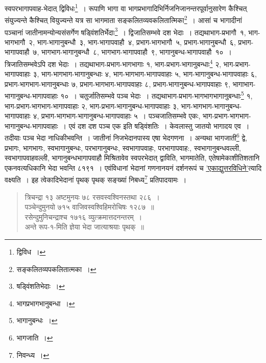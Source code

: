 \documentclass[10pt, openany]{book}
\begin{document}
\newpage

{स्वपरभागापवाह-भेदात् द्विविधः\renewcommand{\thefootnote}{\s ३}\footnote{\s  द्विविध~।}~। रूपाणि भागा वा
भागप्रभागादिभिर्निजनिजानन्तरपूर्वानुसारेण 
कैश्चित् संयुज्यन्ते कैश्चित् वियुज्यन्ते यत्र सा भागमाता
सङ्कलितव्यवकलितात्मिका\renewcommand{\thefootnote}{\s ४}\footnote{\s  सङ्कलितव्यपकलितात्मका~।}~। आसां च भागादीनां पञ्चानां जातीनामन्योन्यसंसर्गेण
षड्विंशतिर्भेदाः\renewcommand{\thefootnote}{\s ५}\footnote{\s षड्विंशतिभेदाः~।}~।}
{द्विजातिसम्भवे दश भेदाः~। तद्यथा\textemdash भाग-प्रभागौ~१, भाग-भागभागौ~२,
भाग-भागानुबन्धौ~३,}
{भाग-भागापवाहौ~४, प्रभाग-भागभागौ~५, प्रभाग-भागानुबन्धौ~६,
प्रभाग-भागापवाहौ~७,}
{भागभाग-भागानुबन्धौ~८, भागभाग-भागापवाहौ~९, भागानुबन्ध-भागापवाहौ~१०~।
त्रिजातिसम्भवेऽपि दश भेदाः~। तद्यथा\textemdash भाग-प्रभाग-भागभागाः १,
भाग-प्रभाग-भागानुबन्धाः\renewcommand{\thefootnote}{\s ६}\footnote{\s भागप्रभागभानुबन्धा~।} २,}
{भाग-प्रभाग-भागापवाहाः ३, भाग-भागभाग-भागानुबन्धाः ४,
भाग-भागभाग-भागापवाहाः ५,}
{भाग-भागानुबन्ध-भागापवाहाः ६, प्रभाग-भागभाग-भागानुबन्धाः ७,
प्रभाग-भागभाग-भागापवाहाः}
{८, प्रभाग-भागानुबन्ध-भागापवाहाः ९, भागाभाग-भागानुबन्ध-भागापवाहाः १०~।
चतुर्जातिसम्भवे}
{पञ्च भेदाः~। तद्यथा\textemdash  भाग-प्रभाग-भागभागभागानुबन्धाः\renewcommand{\thefootnote}{\s ७}\footnote{\s भागानुबन्धः~।} १,
भाग-प्रभाग-भागभाग-भागापवाहाः}
{२, भाग-प्रभाग-भागानुबन्ध-भागापवाहाः ३, भाग-भागभाग-भागानुबन्ध-भागापवाहाः
४, प्रभाग-भागभाग-भागानुबन्ध-भागापवाहाः ५~। पञ्चजातिसम्भवे एकः,
भाग-प्रभाग-भागभाग-भागानुबन्ध-भागापवाहाः~। एवं दश दश पञ्च एक इति षड्विंशतिः~। केवलास्तु जातयो भागादय
एव~।}
{तदीयाः पञ्च भेदा नाधिकीभवन्ति~। जातीनां निजभेदानपास्य एषा भेदगणना~।
अन्यथा}
{भागजाती\renewcommand{\thefootnote}{\s ८}\footnote{\s भागजाति~।}
द्वे, प्रभागः, भागभागः, स्वभागानुबन्धः, परभागानुबन्धः,
स्वभागापवाहः, परभागापवाह:, स्वभागानुबन्धवल्ली, स्वभागापवाहवल्ली, भागानुबन्धभागापवाहौ
मिश्रितावेव}
{स्वपरभेदात् द्वाविति, भागमातेति, एतेषामेकाशीतिशतानि एकनवत्यधिकानि भेदा
भवन्ति}
{८१९१~। एवंविधानां भेदानां गणनानयनं दर्शनरूपं च
\hyperref[72]{'एकाद्युत्तरविधिने'}त्यादि वक्ष्यति~। इह}
{त्वेकादिभेदानां पृथक् पृथक् सङ्ख्यां निबध्य\renewcommand{\thefootnote}{\s९}\footnote{\s निवन्ध्य~।} प्रतिपादयामः~।}

\begin{quote}
    
{\qt त्रिचन्द्रा १३ अष्टमुनयः ७८ रसवस्वश्विनस्तथा २८६~। \\
 पञ्चेन्दुमुनयो ७१५ वाजिवस्वश्विहिमरोचिषः १२८७~॥ \\
 रसेन्दुमुनिचन्द्राश्च १७१६ व्युत्क्रमात्तदनन्तरम्~। \\
 अन्ते रूप-१-मिति ज्ञेया भेदा जात्याश्रयाः पृथक्~॥}\end{quote}
\end{document}
